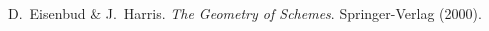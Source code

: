 \documentclass[10pt,oneside,final]{amsart}
\begin{document}

\begin{thebibliography}{.....  ..}
	D.\ Eisenbud \& J.\ Harris.
	\emph{The Geometry of Schemes}.
	Springer-Verlag
	(2000).
\end{thebibliography}
\end{document}
